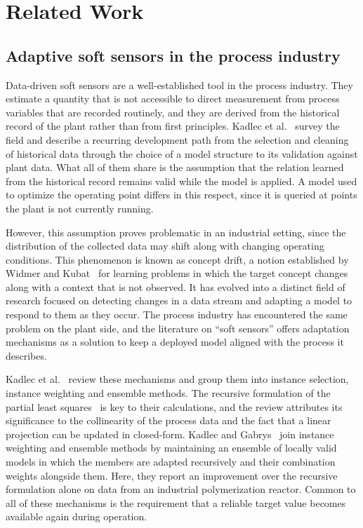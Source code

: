 %
%
\section{Related Work} \label{sec:related_work}

\subsection{Adaptive soft sensors in the process industry} \label{subsec:soft_sensors}

Data-driven soft sensors are a well-established tool in the process industry. They estimate a quantity that is not accessible to direct measurement from process variables that are recorded routinely, and they are derived from the historical record of the plant rather than from first principles. Kadlec et al.~\cite{kadlec.2009} survey the field and describe a recurring development path from the selection and cleaning of historical data through the choice of a model structure to its validation against plant data. What all of them share is the assumption that the relation learned from the historical record remains valid while the model is applied. A model used to optimize the operating point differs in this respect, since it is queried at points the plant is not currently running. \par
%
However, this assumption proves problematic in an industrial setting, since the distribution of the collected data may shift along with changing operating conditions. This phenomenon is known as concept drift, a notion established by Widmer and Kubat~\cite{widmer.1996} for learning problems in which the target concept changes along with a context that is not observed. It has evolved into a distinct field of research focused on detecting changes in a data stream and adapting a model to respond to them as they occur. The process industry has encountered the same problem on the plant side, and the literature on “soft sensors” offers adaptation mechanisms as a solution to keep a deployed model aligned with the process it describes. \par
%
Kadlec et al.~\cite{kadlec.2011} review these mechanisms and group them into instance selection, instance weighting and ensemble methods. The recursive formulation of the partial least squares~\cite{qin.1998} is key to their calculations, and the review attributes its significance to the collinearity of the process data and the fact that a linear projection can be updated in closed-form. Kadlec and Gabrys~\cite{kadlec.2011b} join instance weighting and ensemble methods by maintaining an ensemble of locally valid models in which the members are adapted recursively and their combination weights alongside them. Here, they report an improvement over the recursive formulation alone on data from an industrial polymerization reactor. Common to all of these mechanisms is the requirement that a reliable target value becomes available again during operation. \par

